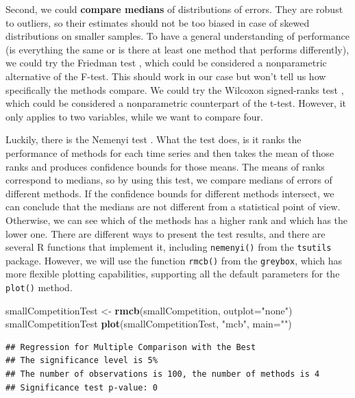 \documentclass[]{book}
\newenvironment{Shaded}{\begin{snugshade}}{\end{snugshade}}
\newcommand{\DataTypeTok}[1]{\textcolor[rgb]{0.13,0.29,0.53}{#1}}
\newcommand{\KeywordTok}[1]{\textcolor[rgb]{0.13,0.29,0.53}{\textbf{#1}}}
\newcommand{\NormalTok}[1]{#1}
\newcommand{\StringTok}[1]{\textcolor[rgb]{0.31,0.60,0.02}{#1}}
\theoremstyle{definition}
\theoremstyle{definition}
\theoremstyle{definition}
\theoremstyle{definition}
\theoremstyle{remark}
\begin{document}
Second, we could \textbf{compare medians} of distributions of errors. They are robust to outliers, so their estimates should not be too biased in case of skewed distributions on smaller samples. To have a general understanding of performance (is everything the same or is there at least one method that performs differently), we could try the Friedman test \citep{WikipediaFriedmanTest}, which could be considered a nonparametric alternative of the F-test. This should work in our case but won't tell us how specifically the methods compare. We could try the Wilcoxon signed-ranks test \citep{WikipediaWilcoxonTest}, which could be considered a nonparametric counterpart of the t-test. However, it only applies to two variables, while we want to compare four.

Luckily, there is the Nemenyi test \citep{Demsar2006} \citep[ shows that it is equivalent to the MCB test of \citet{Koning2005}]{KourentzesWeb2012}. What the test does, is it ranks the performance of methods for each time series and then takes the mean of those ranks and produces confidence bounds for those means. The means of ranks correspond to medians, so by using this test, we compare medians of errors of different methods. If the confidence bounds for different methods intersect, we can conclude that the medians are not different from a statistical point of view. Otherwise, we can see which of the methods has a higher rank and which has the lower one. There are different ways to present the test results, and there are several R functions that implement it, including \texttt{nemenyi()} from the \texttt{tsutils} package. However, we will use the function \texttt{rmcb()} from the \texttt{greybox}, which has more flexible plotting capabilities, supporting all the default parameters for the \texttt{plot()} method.

\begin{Shaded}
\begin{Highlighting}[]
\NormalTok{smallCompetitionTest <-}\StringTok{ }\KeywordTok{rmcb}\NormalTok{(smallCompetition, }\DataTypeTok{outplot=}\StringTok{"none"}\NormalTok{)}
\NormalTok{smallCompetitionTest}
\KeywordTok{plot}\NormalTok{(smallCompetitionTest, }\StringTok{"mcb"}\NormalTok{, }\DataTypeTok{main=}\StringTok{""}\NormalTok{)}
\end{Highlighting}
\end{Shaded}

\begin{verbatim}
## Regression for Multiple Comparison with the Best
## The significance level is 5%
## The number of observations is 100, the number of methods is 4
## Significance test p-value: 0
\end{verbatim}
\end{document}
